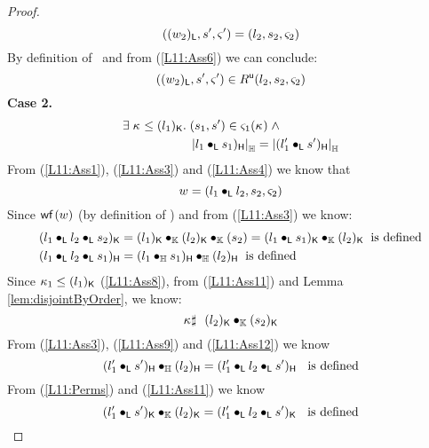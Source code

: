 \begin{lemma}[]
\begin{proof}
\begin{equation}
	((w_2)_{\textsf{L}}, s', \varsigma_{}') = (l_2, s_2, \varsigma_{2}) \label{L11:Ass6}
\end{equation}
%
By definition of \updateR\ and from (\ref{L11:Ass6}) we can conclude:
%
\begin{equation}
	((w_2)_{\textsf{L}}, s', \varsigma_{}') \in R^{\textsf{u}}(l_2, s_2, \varsigma_{2}) \label{L11:Ass7}
\end{equation}
%
\textbf{Case 2.} 
%
\begin{align}
	\exists\; \kappa_{} \leq (l_1)_{\textsf{K}}.\; & (s_1, s') \in \varsigma_{1}(\kappa_{}) \label{L11:Ass8} \;\land\\
	&\left\lvert l_1 \bullet_{\textsf{L}} s_1)_{\textsf{H}}\right\rvert_{\mathbb{H}} = \left\lvert (l'_1 \bullet_{\textsf{L}} s')_{\textsf{H}}\right\rvert_{\mathbb{H}} \label{L11:Ass9}
\end{align}
%
From (\ref{L11:Ass1}), (\ref{L11:Ass3}) and (\ref{L11:Ass4}) we know that 
%
\begin{equation}
	w = (l_1 \bullet_{\textsf{L}} l_2, s_2, \varsigma_{2}) \label{L11:Ass10}
\end{equation}
%
Since $\textsf{wf}\left( w \right)$ (by definition of \Worlds) and from (\ref{L11:Ass3}) we know:
\begin{align}
	&\capPart{(l_1 \composeL l_2 \composeL s_2)} = \capPart{(l_1)} \composeCap \capPart{(l_2)} \composeCap {(s_2)} = \capPart{(l_1 \composeL s_1)} \composeCap \capPart{(l_2)}\hspace*{0.2cm} \text{is defined} \label{L11:Ass11}\\
%	
	&\heapPart{(l_1 \composeL l_2 \composeL s_1)} = \heapPart{(l_1 \composeH s_1)} \composeH \heapPart{(l_2)}  \hspace*{0.2cm} \text{is defined} \label{L11:Ass12}
\end{align}
%
Since $\kappa_{1} \leq (l_1)_{\textsf{K}}$ (\ref{L11:Ass8}), from (\ref{L11:Ass11}) and Lemma \ref{lem:disjointByOrder}, we know:
%
\begin{equation}
	\kappa_{} \sharp\ \ (l_2)_{\textsf{K}} \bullet_{\mathbb{K}} (s_2)_{\textsf{K}} \label{L11:Ass13}
\end{equation}
%
From (\ref{L11:Ass3}), (\ref{L11:Ass9}) and (\ref{L11:Ass12}) we know
%
\begin{equation}
	(l'_1 \bullet_{\textsf{L}} s')_{\textsf{H}} \bullet_{\mathbb{H}} (l_2)_{\textsf{H}} = (l'_1 \bullet_{\textsf{L}} l_2 \bullet_{\textsf{L}} s')_{\textsf{H}}\hspace*{0.2cm}\text{ is defined} \label{L11:Ass14}
\end{equation}
%
From (\ref{L11:Perms}) and (\ref{L11:Ass11}) we know
%
\begin{equation}
	\capPart{(l'_1 \composeL s')} \composeCap \capPart{(l_2)} = \capPart{(l'_1 \composeL l_2 \composeL s')}\hspace*{0.2cm}\text{ is defined} \label{L11:Ass15}

\end{equation}
\end{proof}
\end{lemma}
